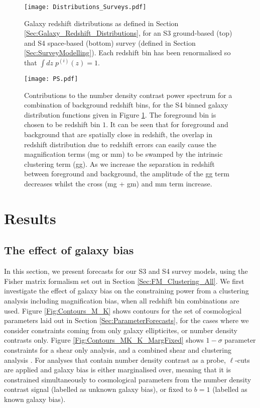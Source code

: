 \documentclass[useAMS,usenatbib,times,letter,amssymb]{mn2e}
\begin{document}
\begin{figure}
\texttt{[image: Distributions\_Surveys.pdf]}
\caption{Galaxy redshift distributions as defined in Section \ref{Sec:Galaxy_Redshift_Distributions}, for an S3 ground-based (top) and S4 space-based (bottom) survey (defined in Section \ref{Sec:SurveyModelling}). Each redshift bin has been renormalised so that $\int dz \; p^{(i)}(z) = 1$. }\label{fig:SpecRedshiftDist}\label{Fig:Distributions}
\end{figure}

\begin{figure}
\centering
\texttt{[image: PS.pdf]}
\caption{Contributions to the number density contrast power spectrum for a combination of background redshift bins, for the S4 binned galaxy distribution functions given in Figure \ref{Fig:Distributions}. The foreground bin is chosen to be redshift bin $1$. It can be seen that for foreground and background that are spatially close in redshift, the overlap in redshift distribution due to redshift errors can easily cause the magnification terms (mg or mm) to be swamped by the intrinsic clustering term (gg). As we increase the separation in redshift between foreground and background, the amplitude of the gg term decreases whilst the cross (mg + gm) and mm term increase.} \label{Fig:NumberPowerSpectra}
\end{figure}

\section{Results}\label{Sec:Results}

\subsection{The effect of galaxy bias}
In this section, we present forecasts for our S3 and S4 survey models, using the Fisher matrix formalism set out in Section \ref{Sec:FM_Clustering_All}. We first investigate the effect of galaxy bias on the constraining power from a clustering analysis including magnification bias, when all redshift bin combinations are used. Figure \ref{Fig:Contours_M_K} shows contours for the set of cosmological parameters laid out in Section \ref{Sec:ParameterForecasts}, for the cases where we consider constraints coming from only galaxy ellipticites, or number density contrasts only.  Figure \ref{Fig:Contours_MK_K_MargFixed} shows $1-\sigma$ parameter constraints for a shear only analysis, and a combined shear and clustering analysis . For analyses that contain number density contrast as a probe, $\ell$-cuts are applied and galaxy bias is either marginalised over, meaning that it is constrained simultaneously to cosmological parameters from the number density contrast signal (labelled as unknown galaxy bias), or fixed to $b = 1$ (labelled as known galaxy bias). 
\end{document}
